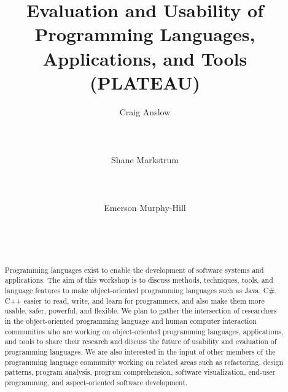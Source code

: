 \documentclass{acm_proc_article-sp}
\begin{document}
\title{Evaluation and Usability of Programming Languages, Applications, and Tools  (PLATEAU)}

\author{
\alignauthor Craig Anslow\\
       \\
       \\
       \\
\alignauthor Shane Markstrum\\
       \\
       \\
       \\
\alignauthor Emerson Murphy-Hill\\
       \\
       \\
       \\
       }

\date{}

\maketitle
\begin{abstract}

Programming languages exist to enable the development of software systems and applications. The aim of this workshop is to discuss methods, techniques, tools, and language features to make object-oriented programming languages such as Java, C\#, C++ easier to read, write, and learn for programmers, and also make them more usable, safer, powerful, and flexible. We plan to gather the intersection of researchers in the object-oriented programming language and human computer interaction communities who are working on object-oriented programming languages, applications, and tools to share their research and discuss the future of usability and evaluation of programming languages. We are also interested in the input of other members of the programming language community working on related areas such as refactoring, design patterns, program analysis, program comprehension, software visualization, end-user programming, and aspect-oriented software development.

\end{abstract}
\end{document}
